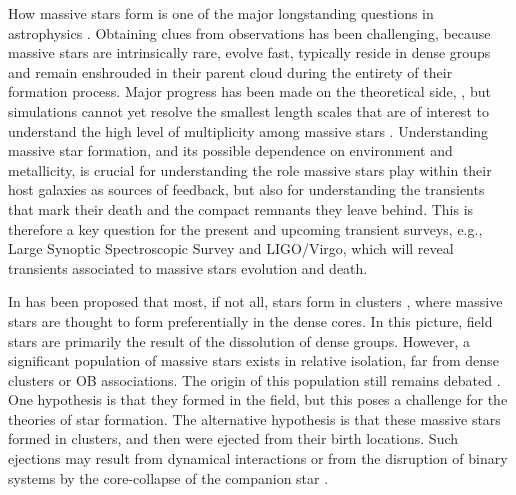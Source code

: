 \documentclass[apjl,twocolumn]{emulateapj}
\newcommand{\todo}[1]{{\large $\blacksquare$~\textbf{\color{red}[#1]}}~$\blacksquare$}
\begin{document}
How massive stars form is one of the major longstanding questions in astrophysics
\citep[e.g.,][]{zinnecker:07}. Obtaining clues from observations has been challenging, because massive stars are intrinsically rare, 
evolve fast, typically reside in dense groups and remain enshrouded in
their parent cloud during the entirety of their formation
process. Major progress has been made on the theoretical side,
\citep[e.g.][]{kuiper:15,rosen:16}, but simulations cannot yet resolve
the smallest length scales that are of interest to understand the 
high level of multiplicity among massive stars  \citep[e.g.,][]{bate:09, sana:17}. Understanding massive star formation, and its
possible dependence on environment and metallicity, is crucial for
understanding the role massive stars play within their host galaxies
as sources of feedback, but also for understanding the transients that
mark their death and the compact remnants they leave behind. This is
therefore a key question for the present and upcoming transient
surveys, e.g., Large Synoptic Spectroscopic Survey and LIGO/Virgo,
which  will reveal transients associated to massive stars
evolution and death.

In has been proposed that most, if not all, stars form in clusters \citep{lada:03}, where massive stars are thought to  form preferentially in the dense cores. In this picture, field stars are primarily the result of the dissolution of dense groups. 
However, a significant population of massive stars exists in relative
isolation,  far from dense clusters or OB associations. The origin of
this population still remains debated \citep{gvaramadze:12, lamb:16,ward:18}.  One
hypothesis is that they  formed in the field, but this poses a
challenge for the theories of star formation. The alternative
hypothesis is that these massive stars formed in clusters, and then
were ejected from their birth locations. Such ejections may result
from dynamical interactions \citep[e.g.,][]{poveda:67} or from the
disruption of binary systems by the core-collapse of the companion
star \citep[e.g.,][]{zwicky:57, blaauw:61, renzo:18}. 
 
\end{document}
